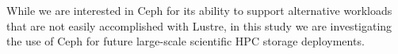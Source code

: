 While we are interested in Ceph for its ability to support alternative
workloads that are not easily accomplished with Lustre, in this study we are
investigating the use of Ceph for future large-scale scientific HPC storage
deployments. 



